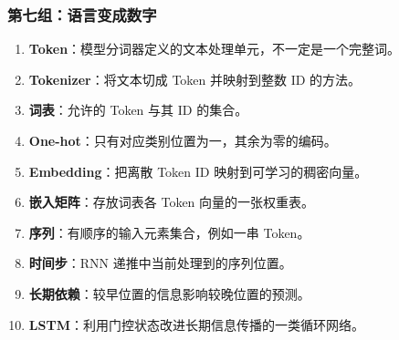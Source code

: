 \subsubsection{第七组：语言变成数字}
\begin{enumerate}[leftmargin=2.5em,itemsep=4pt,start=61]
\item \textbf{Token}：模型分词器定义的文本处理单元，不一定是一个完整词。 
\item \textbf{Tokenizer}：将文本切成 Token 并映射到整数 ID 的方法。 
\item \textbf{词表}：允许的 Token 与其 ID 的集合。 
\item \textbf{One-hot}：只有对应类别位置为一，其余为零的编码。 
\item \textbf{Embedding}：把离散 Token ID 映射到可学习的稠密向量。 
\item \textbf{嵌入矩阵}：存放词表各 Token 向量的一张权重表。 
\item \textbf{序列}：有顺序的输入元素集合，例如一串 Token。 
\item \textbf{时间步}：RNN 递推中当前处理到的序列位置。 
\item \textbf{长期依赖}：较早位置的信息影响较晚位置的预测。 
\item \textbf{LSTM}：利用门控状态改进长期信息传播的一类循环网络。 
\end{enumerate}

